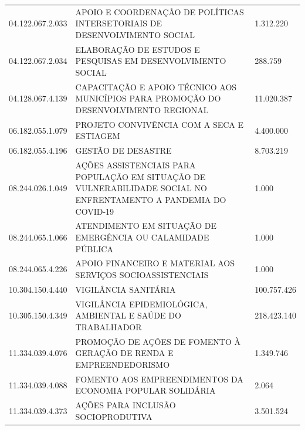 \documentclass{article}
\begin{document}
\begin{longtable}[c]{m{3cm}|m{12cm}|m{2cm}}
\multicolumn{1}{C{3cm}|}{04.122.067.2.033} & \multicolumn{1}{L{12cm}|}{APOIO E COORDENAÇÃO DE POLÍTICAS INTERSETORIAIS DE DESENVOLVIMENTO SOCIAL} & \multicolumn{1}{R{2cm}}{1.312.220} \\
\multicolumn{1}{C{3cm}|}{04.122.067.2.034} & \multicolumn{1}{L{12cm}|}{ELABORAÇÃO DE ESTUDOS E PESQUISAS EM DESENVOLVIMENTO SOCIAL} & \multicolumn{1}{R{2cm}}{288.759} \\
\multicolumn{1}{C{3cm}|}{04.128.067.4.139} & \multicolumn{1}{L{12cm}|}{CAPACITAÇÃO E APOIO TÉCNICO AOS MUNICÍPIOS PARA PROMOÇÃO DO DESENVOLVIMENTO REGIONAL} & \multicolumn{1}{R{2cm}}{11.020.387} \\
\multicolumn{1}{C{3cm}|}{06.182.055.1.079} & \multicolumn{1}{L{12cm}|}{PROJETO CONVIVÊNCIA COM A SECA E ESTIAGEM} & \multicolumn{1}{R{2cm}}{4.400.000} \\
\multicolumn{1}{C{3cm}|}{06.182.055.4.196} & \multicolumn{1}{L{12cm}|}{GESTÃO DE DESASTRE} & \multicolumn{1}{R{2cm}}{8.703.219} \\
\multicolumn{1}{C{3cm}|}{08.244.026.1.049} & \multicolumn{1}{L{12cm}|}{AÇÕES ASSISTENCIAIS PARA POPULAÇÃO EM SITUAÇÃO DE VULNERABILIDADE SOCIAL NO ENFRENTAMENTO A PANDEMIA DO COVID-19} & \multicolumn{1}{R{2cm}}{1.000} \\
\multicolumn{1}{C{3cm}|}{08.244.065.1.066} & \multicolumn{1}{L{12cm}|}{ATENDIMENTO EM SITUAÇÃO DE EMERGÊNCIA OU CALAMIDADE PÚBLICA} & \multicolumn{1}{R{2cm}}{1.000} \\
\multicolumn{1}{C{3cm}|}{08.244.065.4.226} & \multicolumn{1}{L{12cm}|}{APOIO FINANCEIRO E MATERIAL AOS SERVIÇOS SOCIOASSISTENCIAIS} & \multicolumn{1}{R{2cm}}{1.000} \\
\multicolumn{1}{C{3cm}|}{10.304.150.4.440} & \multicolumn{1}{L{12cm}|}{VIGILÂNCIA SANITÁRIA} & \multicolumn{1}{R{2cm}}{100.757.426} \\
\multicolumn{1}{C{3cm}|}{10.305.150.4.349} & \multicolumn{1}{L{12cm}|}{VIGILÂNCIA EPIDEMIOLÓGICA, AMBIENTAL E SAÚDE DO TRABALHADOR} & \multicolumn{1}{R{2cm}}{218.423.140} \\
\multicolumn{1}{C{3cm}|}{11.334.039.4.076} & \multicolumn{1}{L{12cm}|}{PROMOÇÃO DE AÇÕES DE FOMENTO À GERAÇÃO DE RENDA E EMPREENDEDORISMO} & \multicolumn{1}{R{2cm}}{1.349.746} \\
\multicolumn{1}{C{3cm}|}{11.334.039.4.088} & \multicolumn{1}{L{12cm}|}{FOMENTO AOS EMPREENDIMENTOS DA ECONOMIA POPULAR SOLIDÁRIA} & \multicolumn{1}{R{2cm}}{2.064} \\
\multicolumn{1}{C{3cm}|}{11.334.039.4.373} & \multicolumn{1}{L{12cm}|}{AÇÕES PARA INCLUSÃO SOCIOPRODUTIVA} & \multicolumn{1}{R{2cm}}{3.501.524} \\

\end{longtable}
\end{document}
